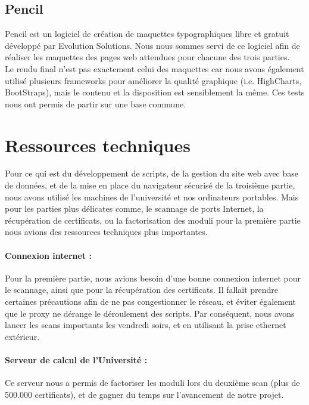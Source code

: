 \subsection{Pencil}

Pencil \cite{pencil} est un logiciel de création de maquettes typographiques libre et gratuit développé par Evolution Solutions.
Nous nous sommes servi de ce logiciel afin de réaliser les maquettes des pages web attendues pour chacune des trois parties.\\
Le rendu final n'est pas exactement celui des maquettes car nous avons également utilisé plusieurs frameworks pour améliorer la qualité graphique (i.e. HighCharts, BootStraps), mais le contenu et la disposition est sensiblement la même.
Ces tests nous ont permis de partir sur une base commune.

\section{Ressources techniques}

Pour ce qui est du développement de scripts, de la gestion du site web avec base de données, et de la mise en place du navigateur sécurisé de la troisième partie, nous avons utilisé les machines de l'université et nos ordinateurs portables. Mais pour les parties plus délicates comme, le scannage de ports Internet, la récupération de certificats, ou la factorisation des moduli pour la première partie nous avions des ressources techniques plus importantes.

\paragraph{Connexion internet : } Pour la première partie, nous avions besoin d'une bonne connexion internet pour le scannage, ainsi que pour la récupération des certificats. Il fallait prendre certaines précautions afin de ne pas congestionner le réseau, et éviter également que le proxy ne dérange le déroulement des scripts. Par conséquent, nous avons lancer les scans importants les vendredi soirs, et en utilisant la prise ethernet extérieur.

\paragraph{Serveur de calcul de l'Université :} Ce serveur nous a permis de factoriser les moduli lors du deuxième scan (plus de 500.000 certificats), et de gagner du temps sur l'avancement de notre projet.

